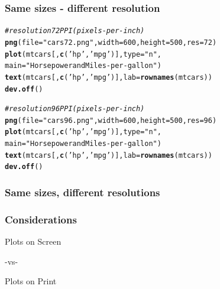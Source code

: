 \documentclass[12pt]{beamer}\usepackage[]{graphicx}\usepackage[]{color}
\makeatletter
\newcommand{\hlnum}[1]{\textcolor[rgb]{0.686,0.059,0.569}{#1}}%
\newcommand{\hlstr}[1]{\textcolor[rgb]{0.192,0.494,0.8}{#1}}%
\newcommand{\hlcom}[1]{\textcolor[rgb]{0.678,0.584,0.686}{\textit{#1}}}%
\newcommand{\hlstd}[1]{\textcolor[rgb]{0.345,0.345,0.345}{#1}}%
\newcommand{\hlkwc}[1]{\textcolor[rgb]{0.333,0.667,0.333}{#1}}%
\newcommand{\hlkwd}[1]{\textcolor[rgb]{0.737,0.353,0.396}{\textbf{#1}}}%
\newenvironment{kframe}{%
 \def\at@end@of@kframe{}%
 \ifinner\ifhmode%
  \def\at@end@of@kframe{\end{minipage}}%
  \begin{minipage}{\columnwidth}%
 \fi\fi%
 \def\FrameCommand##1{\hskip\@totalleftmargin \hskip-\fboxsep
 \colorbox{shadecolor}{##1}\hskip-\fboxsep
     \hskip-\linewidth \hskip-\@totalleftmargin \hskip\columnwidth}%
 \MakeFramed {\advance\hsize-\width
   \@totalleftmargin\z@ \linewidth\hsize
   \@setminipage}}%
 {\par\unskip\endMakeFramed%
 \at@end@of@kframe}
\newenvironment{knitrout}{}{} %
\makeatother
\begin{document}
\begin{frame}[fragile]
\frametitle{Same sizes - different resolution}

\begin{knitrout}\footnotesize
{}\color{fgcolor}\begin{kframe}
\begin{alltt}
\hlcom{# resolution 72 PPI (pixels-per-inch)}
\hlkwd{png}\hlstd{(}\hlkwc{file} \hlstd{=} \hlstr{"cars72.png"}\hlstd{,} \hlkwc{width} \hlstd{=} \hlnum{600}\hlstd{,} \hlkwc{height} \hlstd{=} \hlnum{500}\hlstd{,} \hlkwc{res} \hlstd{=} \hlnum{72}\hlstd{)}
\hlkwd{plot}\hlstd{(mtcars[ ,}\hlkwd{c}\hlstd{(}\hlstr{'hp'}\hlstd{,} \hlstr{'mpg'}\hlstd{)],} \hlkwc{type} \hlstd{=} \hlstr{"n"}\hlstd{,}
     \hlkwc{main} \hlstd{=} \hlstr{"Horsepower and Miles-per-gallon"}\hlstd{)}
\hlkwd{text}\hlstd{(mtcars[ ,}\hlkwd{c}\hlstd{(}\hlstr{'hp'}\hlstd{,} \hlstr{'mpg'}\hlstd{)],} \hlkwc{lab} \hlstd{=} \hlkwd{rownames}\hlstd{(mtcars))}
\hlkwd{dev.off}\hlstd{()}


\hlcom{# resolution 96 PPI (pixels-per-inch)}
\hlkwd{png}\hlstd{(}\hlkwc{file} \hlstd{=} \hlstr{"cars96.png"}\hlstd{,} \hlkwc{width} \hlstd{=} \hlnum{600}\hlstd{,} \hlkwc{height} \hlstd{=} \hlnum{500}\hlstd{,} \hlkwc{res} \hlstd{=} \hlnum{96}\hlstd{)}
\hlkwd{plot}\hlstd{(mtcars[ ,}\hlkwd{c}\hlstd{(}\hlstr{'hp'}\hlstd{,} \hlstr{'mpg'}\hlstd{)],} \hlkwc{type} \hlstd{=} \hlstr{"n"}\hlstd{,}
     \hlkwc{main} \hlstd{=} \hlstr{"Horsepower and Miles-per-gallon"}\hlstd{)}
\hlkwd{text}\hlstd{(mtcars[ ,}\hlkwd{c}\hlstd{(}\hlstr{'hp'}\hlstd{,} \hlstr{'mpg'}\hlstd{)],} \hlkwc{lab} \hlstd{=} \hlkwd{rownames}\hlstd{(mtcars))}
\hlkwd{dev.off}\hlstd{()}
\end{alltt}
\end{kframe}
\end{knitrout}

\end{frame}


\begin{frame}
\frametitle{Same sizes, different resolutions}
\begin{center}
\end{center}
\end{frame}


\begin{frame}[c]
\frametitle{Considerations}

\centering
{\Large \mdlit Plots on Screen}

\vspace{18pt}

-vs-

\vspace{18pt}

{\Large \mdlit Plots on Print}

\end{frame}
\end{document}
